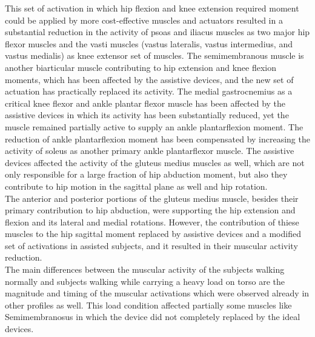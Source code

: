 \documentclass[10pt,letterpaper]{article}
\begin{document}
This set of activation in which hip flexion and knee extension required moment could be applied by more cost-effective muscles and actuators resulted in a substantial reduction in the activity of psoas and iliacus muscles as two major hip flexor muscles and the vasti muscles (vastus lateralis, vastus intermedius, and vastus medialis) as knee extensor set of muscles. The semimembranous muscle is another biarticular muscle contributing to hip extension and knee flexion moments, which has been affected by the assistive devices, and the new set of actuation has practically replaced its activity. The medial gastrocnemius as a critical knee flexor and ankle plantar flexor muscle has been affected by the assistive devices in which its activity has been substantially reduced, yet the muscle remained partially active to supply an ankle plantarflexion moment. The reduction of ankle plantarflexion moment has been compensated by increasing the activity of soleus as another primary ankle plantarflexor muscle. The assistive devices affected the activity of the gluteus medius muscles as well, which are not only responsible for a large fraction of hip abduction moment, but also they contribute to hip motion in the sagittal plane as well and hip rotation.\\
The anterior and posterior portions of the gluteus medius muscle, besides their primary contribution to hip abduction, were supporting the hip extension and flexion and its lateral and medial rotations. However, the contribution of thiese muscles to the hip sagittal moment replaced by assistive devices and a modified set of activations in assisted subjects, and it resulted in their muscular activity reduction.\\
The main differences between the muscular activity of the subjects walking normally and subjects walking while carrying a heavy load on torso are the magnitude and timing of the muscular activations which were observed already in other profiles as well. This load condition affected partially some muscles like Semimembranosus in which the device did not completely replaced by the ideal devices.
\end{document}
